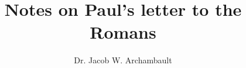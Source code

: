 \documentclass[a4paper,12pt]{book}
\begin{document}
\author{Dr. Jacob W. Archambault}
\title{Notes on Paul's letter to the Romans}

\frontmatter
\maketitle
\tableofcontents

\mainmatter



\backmatter
\end{document}
